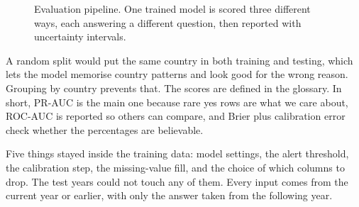 \documentclass[10pt]{article}
\begin{document}
\begin{figure}[htbp]
\caption{Evaluation pipeline. One trained model is scored three different ways, each
answering a different question, then reported with uncertainty intervals.}
\label{fig:evalflow}
\end{figure}


A random split would put the same country in both training and testing, which lets the
model memorise country patterns and look good for the wrong reason. Grouping by country
prevents that. The scores are defined in the glossary. In short, PR-AUC is the main one
because rare yes rows are what we care about, ROC-AUC is reported so others can compare,
and Brier plus calibration error check whether the percentages are believable.

Five things stayed inside the training data: model settings, the alert threshold, the
calibration step, the missing-value fill, and the choice of which columns to drop. The test
years could not touch any of them. Every input comes from the current year or earlier, with
only the answer taken from the following year.
\end{document}

